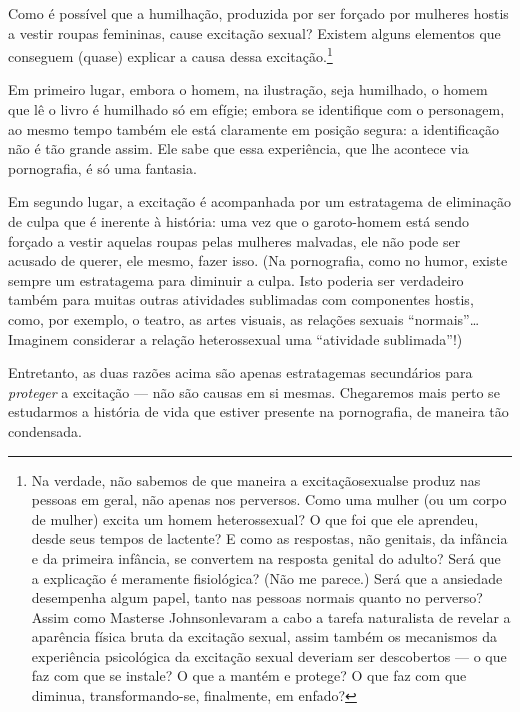 Como é possível que a humilhação, produzida por ser forçado por
mulheres hostis a vestir roupas femininas, cause\idxsexue{} excitação sexual?\idxpornoexci{}
Existem alguns elementos que conseguem (quase) explicar a causa dessa
excitação.\footnote{ Na verdade, não sabemos de que maneira a
excitação\idxsexue[|nn] sexual\idxpornoexci[|nn] se produz nas pessoas em geral, não apenas nos
perversos. Como uma mulher (ou um corpo de mulher) excita um homem
heterossexual? O que foi que ele aprendeu, desde seus tempos de
lactente? E como as respostas, não genitais, da infância e da
primeira infância, se convertem na resposta genital do adulto? Será que
a explicação é meramente fisiológica? (Não me parece.) Será que a
ansiedade desempenha algum papel, tanto nas pessoas normais quanto no
perverso? Assim como Masters\idxmaste[|nn] e Johnson\idxjohns[|nn] levaram a cabo a tarefa
naturalista de revelar a aparência física bruta da excitação sexual,
assim também os mecanismos da experiência psicológica da excitação
sexual deveriam ser descobertos --- o que faz com que se instale? O
que a mantém e protege? O que faz com que diminua, transformando-se,
finalmente, em enfado?}

Em primeiro lugar, embora o homem, na ilustração, seja humilhado, o
homem que lê o livro é humilhado só em efígie; embora se identifique
com o personagem, ao mesmo tempo também ele está claramente em posição
segura: a identificação não é tão grande assim. Ele sabe que essa
experiência, que lhe acontece via pornografia, é só uma fantasia.\idxtravemhumi[|)]

Em segundo lugar, a excitação é acompanhada por um estratagema de
eliminação de culpa\idxculpar{} que é inerente à história: uma vez que o
garoto-homem está sendo forçado a vestir aquelas roupas pelas mulheres
malvadas, ele não pode ser acusado de querer, ele mesmo, fazer isso.
(Na pornografia, como no humor, existe sempre um estratagema para
diminuir a culpa.\idxpornodisp{} Isto poderia ser verdadeiro também para muitas outras
atividades sublimadas com componentes hostis, como, por exemplo, o
teatro, as artes visuais, as relações sexuais
``normais''\ldots{} Imaginem considerar a relação
heterossexual uma ``atividade sublimada''!)

Entretanto, as duas razões acima são apenas estratagemas secundários
para \textit{proteger} a excitação --- não são causas em si mesmas.
Chegaremos mais perto se estudarmos a história\idxpornoreal{} de vida que estiver
presente na pornografia, de maneira tão condensada.

